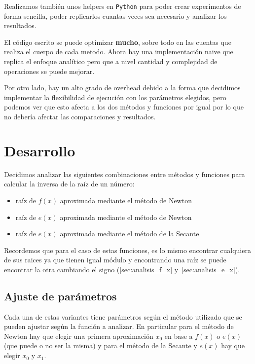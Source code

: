 Realizamos también unos helpers en \verb|Python| para poder crear experimentos
de forma sencilla, poder replicarlos cuantas veces sea necesario y analizar
los resultados.

El código escrito se puede optimizar \textbf{mucho}, sobre todo en las cuentas
que realiza el cuerpo de cada metodo. Ahora hay una implementación naive que
replica el enfoque analítico pero que a nivel cantidad y complejidad de
operaciones se puede mejorar.

Por otro lado, hay un alto grado de overhead debido a la forma que decidimos
implementar la flexibilidad de ejecución con los parámetros elegidos, pero
podemos ver que esto afecta a los dos métodos y funciones por igual por lo que
no debería afectar las comparaciones y resultados.

\newpage
\section{Desarrollo}

Decidimos analizar las siguientes combinaciones entre métodos y funciones para
calcular la inversa de la raíz de un número:

\begin{itemize}
    \item raíz de $f(x)$ aproximada mediante el método de Newton
    \item raíz de $e(x)$ aproximada mediante el método de Newton
    \item raíz de $e(x)$ aproximada mediante el método de la Secante
\end{itemize}

Recordemos que para el caso de estas funciones, es lo mismo encontrar
cualquiera de sus raices ya que tienen igual módulo y encontrando una raíz se
puede encontrar la otra cambiando el signo (\ref{sec:analisis_f_x}
y~\ref{sec:analisis_e_x}).

\subsection{Ajuste de parámetros}\label{sec:ajuste_parametros}

Cada una de estas variantes tiene parámetros según el método utilizado que se
pueden ajustar según la función a analizar. En particular para el método de
Newton hay que elegir una primera aproximación $x_0$ en base a $f(x)$ o $e(x)$
(que puede o no ser la misma) y para el método de la Secante y $e(x)$ hay que
elegir $x_0$ y $x_1$.

